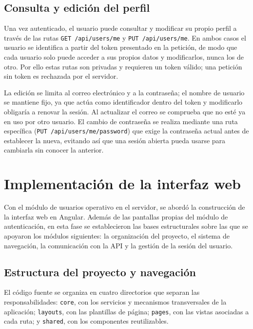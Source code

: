 \documentclass[12pt,a4paper,twoside,openright]{book}
\begin{document}
    \subsection{Consulta y edición del perfil}

    Una vez autenticado, el usuario puede consultar y modificar su propio
    perfil a través de las rutas \texttt{GET /api/users/me} y
    \texttt{PUT /api/users/me}. En ambos casos el usuario se identifica a partir
    del token presentado en la petición, de modo que cada usuario solo puede
    acceder a sus propios datos y modificarlos, nunca los de otro. Por ello estas
    rutas son privadas y requieren un token válido; una petición sin token es
    rechazada por el servidor.

    La edición se limita al correo electrónico y a la contraseña; el nombre de
    usuario se mantiene fijo, ya que actúa como identificador dentro del token y
    modificarlo obligaría a renovar la sesión. Al actualizar el correo se
    comprueba que no esté ya en uso por otro usuario. El cambio de contraseña se
    realiza mediante una ruta específica (\texttt{PUT /api/users/me/password})
    que exige la contraseña actual antes de establecer la nueva, evitando así que
    una sesión abierta pueda usarse para cambiarla sin conocer la anterior.

        \section{Implementación de la interfaz web}

    Con el módulo de usuarios operativo en el servidor, se abordó la
    construcción de la interfaz web en Angular. Además de las pantallas propias
    del módulo de autenticación, en esta fase se establecieron las bases
    estructurales sobre las que se apoyaron los módulos siguientes: la
    organización del proyecto, el sistema de navegación, la comunicación con la
    API y la gestión de la sesión del usuario.

    \subsection{Estructura del proyecto y navegación}

    El código fuente se organiza en cuatro directorios que separan las
    responsabilidades: \texttt{core}, con los servicios y mecanismos
    transversales de la aplicación; \texttt{layouts}, con las plantillas de
    página; \texttt{pages}, con las vistas asociadas a cada ruta; y
    \texttt{shared}, con los componentes reutilizables.
\end{document}
